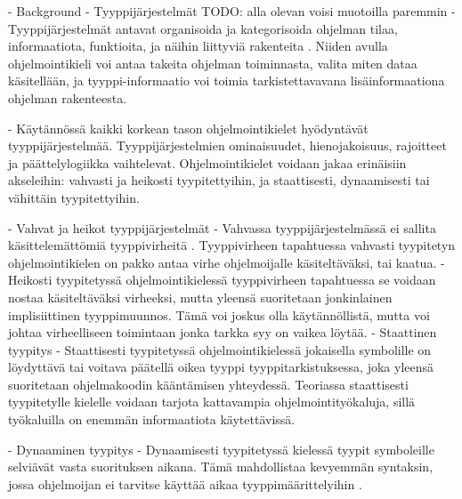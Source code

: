 \begin{otherlanguage}{finnish}
- Background
    - Tyyppijärjestelmät
            TODO: alla olevan voisi muotoilla paremmin
        - Tyyppijärjestelmät antavat organisoida ja kategorisoida ohjelman tilaa, informaatiota, funktioita, ja näihin liittyviä rakenteita \cite{programming_langs}. Niiden avulla ohjelmointikieli voi antaa takeita ohjelman toiminnasta, valita miten dataa käsitellään, ja tyyppi-informaatio voi toimia tarkistettavavana lisäinformaationa ohjelman rakenteesta.

        - Käytännössä kaikki korkean tason ohjelmointikielet hyödyntävät tyyppijärjestelmää. Tyyppijärjestelmien ominaisuudet, hienojakoisuus, rajoitteet ja päättelylogiikka vaihtelevat. Ohjelmointikielet voidaan jakaa erinäisiin akseleihin: vahvasti ja heikosti tyypitettyihin, ja staattisesti, dynaamisesti tai vähittäin tyypitettyihin.

    - Vahvat ja heikot tyyppijärjestelmät
        - Vahvassa tyyppijärjestelmässä ei sallita käsittelemättömiä tyyppivirheitä \cite{cardelli_typeful_1989}. Tyyppivirheen tapahtuessa vahvasti tyypitetyn ohjelmointikielen on pakko antaa virhe ohjelmoijalle käsiteltäväksi, tai kaatua.
        - Heikosti tyypitetyssä ohjelmointikielessä tyyppivirheen tapahtuessa se voidaan nostaa käsiteltäväksi virheeksi, mutta yleensä suoritetaan jonkinlainen implisiittinen tyyppimuunnos. Tämä voi joskus olla käytännöllistä, mutta voi johtaa virheelliseen toimintaan jonka tarkka syy on vaikea löytää.
    - Staattinen tyypitys
        - Staattisesti tyypitetyssä ohjelmointikielessä jokaisella symbolille on löydyttävä tai voitava päätellä oikea tyyppi tyyppitarkistuksessa, joka yleensä suoritetaan ohjelmakoodin kääntämisen yhteydessä. Teoriassa staattisesti tyypitetylle kielelle voidaan tarjota kattavampia ohjelmointityökaluja, sillä työkaluilla on enemmän informaatiota käytettävissä.

    - Dynaaminen tyypitys
        - Dynaamisesti tyypitetyssä kielessä tyypit symboleille selviävät vasta suorituksen aikana. Tämä mahdollistaa kevyemmän syntaksin, jossa ohjelmoijan ei tarvitse käyttää aikaa tyyppimäärittelyihin \cite{di_grazia_evolution_2022}.



\end{otherlanguage}
